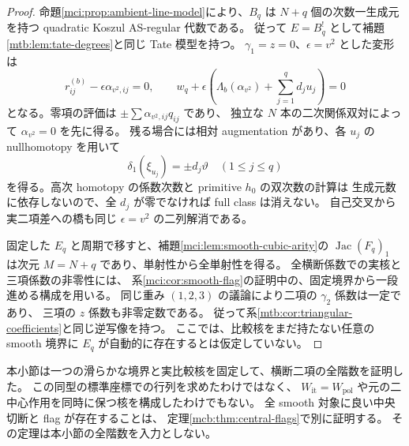 \begin{proof}
命題\ref{mci:prop:ambient-line-model}により、$B_q$ は $N+q$ 個の次数一生成元を持つ
quadratic Koszul AS-regular 代数である。
従って $E=B_q^!$ として補題\ref{mtb:lem:tate-degrees}と同じ Tate 模型を持つ。
$\gamma_1=z=0$、$\epsilon=v^2$ とした変形は
\[
 r_{ij}^{(b)}-\epsilon\alpha_{v^2,ij}=0,\qquad
 w_q+\epsilon\left(\Lambda_b(\alpha_{v^2})
                                +\sum_{j=1}^q d_j u_j\right)=0
\]
となる。零項の評価は $\pm\sum\alpha_{v^2,ij}q_{ij}$ であり、
独立な $N$ 本の二次関係双対によって $\alpha_{v^2}=0$ を先に得る。
残る場合には相対 augmentation があり、各 $u_j$ の nullhomotopy を用いて
\[
                    \delta_1(\xi_{u_j})=\pm d_j\vartheta
                    \quad(1\le j\le q)
\]
を得る。高次 homotopy の係数次数と primitive $h_0$ の双次数の計算は
生成元数に依存しないので、全 $d_j$ が零でなければ full class は消えない。
自己交叉から実二項差への橋も同じ $\epsilon=v^2$ の二列解消である。

固定した $E_q$ と周期で移すと、補題\ref{mci:lem:smooth-cubic-arity}の
$\operatorname{Jac}(F_q)_1$ は次元 $M=N+q$ であり、単射性から全単射性を得る。
全横断係数での実核と三項係数の非零性には、
系\ref{mci:cor:smooth-flag}の証明中の、固定境界から一段進める構成を用いる。
同じ重み $(1,2,3)$ の議論により二項の $\gamma_2$ 係数は一定であり、
三項の $z$ 係数も非零定数である。
従って系\ref{mtb:cor:triangular-coefficients}と同じ逆写像を持つ。
ここでは、比較核をまだ持たない任意の smooth 境界に
$E_q$ が自動的に存在するとは仮定していない。
\end{proof}

\begin{remark}[この検出が与えない同定]
\label{mtb:rem:scope}
本小節は一つの滑らかな境界と実比較核を固定して、横断二項の全階数を証明した。
この同型の標準座標での行列を求めたわけではなく、
$W_{\mathrm{it}}=W_{\mathrm{pol}}$ や元の二中心作用を同時に保つ核を構成したわけでもない。
全 smooth 対象に良い中央切断と flag が存在することは、
定理\ref{mcb:thm:central-flags}で別に証明する。
その定理は本小節の全階数を入力としない。
\end{remark}
